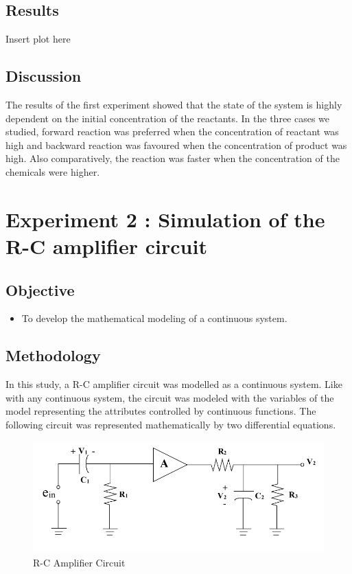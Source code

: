 \documentclass[10pt,journal,cspaper,compsoc]{IEEEtran}
\begin{document}
  \subsection{Results}
    Insert plot here

  \subsection{Discussion}
    The results of the first experiment showed that the state of the system is highly dependent on the initial concentration of the reactants. In the three cases we studied, forward reaction was preferred when the concentration of reactant was high and backward reaction was favoured when the concentration of product was high. Also comparatively, the reaction was faster when the concentration of the chemicals were higher.

\section{Experiment 2 : Simulation of the R-C amplifier circuit}
  \subsection{Objective}
  \begin{itemize}
    \item To develop the mathematical modeling of a continuous system.
  \end{itemize}
  \subsection{Methodology}
  In this study, a R-C amplifier circuit was modelled as a continuous system.
  Like with any continuous system, the circuit was modeled with the
  variables of the model representing the attributes controlled by continuous functions.
  The following circuit was represented mathematically by two differential equations.
  
  \begin{figure}[!h]
    \centering
    \includegraphics[scale = 0.5]{images/circuit.PNG}
    \caption{R-C Amplifier Circuit}
  \end{figure}
\end{document}
